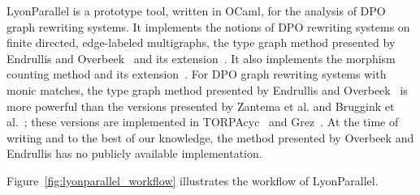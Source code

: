 LyonParallel is a prototype tool, written in OCaml, for the analysis of DPO graph rewriting systems.
It implements the notions of DPO rewriting systems on finite directed, edge-labeled multigraphs, the type graph method presented by Endrullis and Overbeek~\cite{endrullis2024generalized_icgt} and its extension~\cite{qiu2025termination_nwf_v2_acceptedgcm}. It also implements the morphism counting method and its extension~\cite{qiu2025termination_icgt}.
For DPO graph rewriting systems with monic matches,
the type graph method presented by Endrullis and Overbeek~\cite{endrullis2024generalized_icgt} is more powerful than the versions presented by Zantema et al. and Bruggink et al.~\cite{zantema2014termination,bruggink2014termination,bruggink2015proving}; these versions are implemented in TORPAcyc~\cite{TORPAcyc} and Grez~\cite{grez}. At the time of writing and to the best of our knowledge, the method presented by Overbeek and Endrullis has no publicly available implementation.

Figure~\ref{fig:lyonparallel_workflow} illustrates the workflow of LyonParallel.

